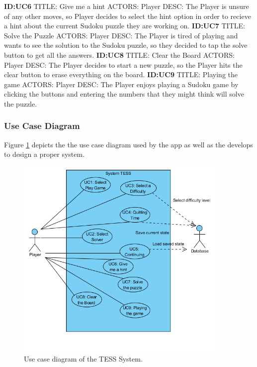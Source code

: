 \documentclass{article}
\begin{document}
\textbf{ID:UC6} \newline TITLE: Give me a hint \newline ACTORS: Player \newline DESC: The Player is unsure of any other moves, so Player decides to select the hint option in order to recieve a hint about the current Sudoku puzzle they are working on. \newline \newline
\textbf{ID:UC7} \newline TITLE: Solve the Puzzle \newline ACTORS: Player \newline DESC: The Player is tired of playing and wants to see the solution to the Sudoku puzzle, so they decided to tap the solve button to get all the answers. \newline \newline
\textbf{ID:UC8} \newline TITLE: Clear the Board \newline ACTORS: Player \newline DESC: The Player decides to start a new puzzle, so the Player hits the clear button to erase everything on the board. \newline \newline
\textbf{ID:UC9} \newline TITLE: Playing the game \newline ACTORS: Player \newline DESC: The Player enjoys playing a Sudoku game by clicking the buttons and entering the numbers that they might think will solve the puzzle. \newline
\subsubsection{Use Case Diagram}
Figure \ref{fig:usecasediagram} depicts the the use case diagram used by the app as well as the develops to design a proper system.
\begin{figure}[ht]\centering
	\includegraphics[width=4.0in]{./Figure/Usecase_Diagram.PNG}
	\caption{Use case diagram of the TESS System.}\label{fig:usecasediagram}
\end{figure}
\end{document}
